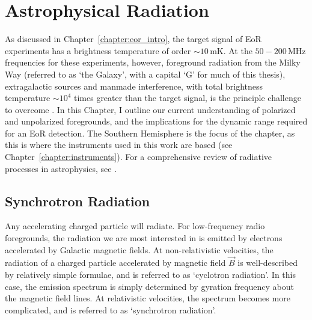 \chapter{Astrophysical Radiation}
\label{chapter:astro_rad}

As discussed in Chapter~\ref{chapter:eor_intro}, the target signal of EoR experiments has a brightness temperature of order $\sim 10$\,mK. At the $50-200$\,MHz frequencies for these experiments, however, foreground radiation from the Milky Way (referred to as `the Galaxy', with a capital `G' for much of this thesis), extragalactic sources and manmade interference, with total brightness temperature $\sim 10^4$ times greater than the target signal, is the principle challenge to overcome \citep[e.g.][]{Santos.05, GSM.08, Bernardi.09, Bernardi.10, Pober.13, Dillon.14, Kohn.16, Kohn.18}. In this Chapter, I outline our current understanding of polarized and unpolarized foregrounds, and the implications for the dynamic range required for an EoR detection. The Southern Hemisphere is the focus of the chapter, as this is where the instruments used in this work are based (see Chapter~\ref{chapter:instruments}). For a comprehensive review of radiative processes in astrophysics, see \cite{Rybicki.79}. 

\section{Synchrotron Radiation}

Any accelerating charged particle will radiate. For low-frequency radio foregrounds, the radiation we are most interested in is emitted by electrons accelerated by Galactic magnetic fields.
At non-relativistic velocities, the radiation of a charged particle accelerated by magnetic field $\vec{B}$ is well-described by relatively simple formulae, and is referred to as `cyclotron radiation'. In this case, the emission spectrum is simply determined by gyration frequency about the magnetic field lines.
At relativistic velocities, the spectrum becomes more complicated, and is referred to as `synchrotron radiation'.

